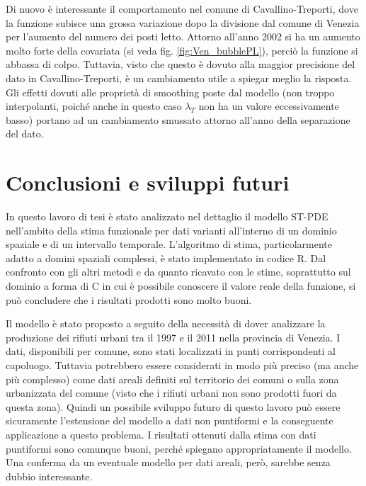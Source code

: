 \documentclass[a4paper,11pt,twoside,openright]{book}							%
\begin{document}
Di nuovo è interessante il comportamento nel comune di Cavallino-Treporti, dove la funzione subisce una grossa variazione dopo la divisione dal comune di Venezia per l'aumento del numero dei posti letto. Attorno all'anno 2002 si ha un aumento molto forte della covariata (si veda fig. \ref{fig:Ven_bubblePL}), perciò la funzione si abbassa di colpo. Tuttavia, visto che questo è dovuto alla maggior precisione del dato in Cavallino-Treporti, è un cambiamento utile a spiegar meglio la risposta. Gli effetti dovuti alle proprietà di smoothing poste dal modello (non troppo interpolanti, poiché anche in questo caso $\lambda_T$ non ha un valore eccessivamente basso) portano ad un cambiamento smussato attorno all'anno della separazione del dato.

\chapter{Conclusioni e sviluppi futuri}
\label{cap:conclusione}

In questo lavoro di tesi è stato analizzato nel dettaglio il modello ST-PDE nell'ambito della stima funzionale per dati varianti all'interno di un dominio spaziale e di un intervallo temporale. L'algoritmo di stima, particolarmente adatto a domini spaziali complessi, è stato implementato in codice R. Dal confronto con gli altri metodi e da quanto ricavato con le stime, soprattutto sul dominio a forma di C in cui è possibile conoscere il valore reale della funzione, si può concludere che i risultati prodotti sono molto buoni.

Il modello è stato proposto a seguito della necessità di dover analizzare la produzione dei rifiuti urbani tra il 1997 e il 2011 nella provincia di Venezia. I dati, disponibili per comune, sono stati localizzati in punti corrispondenti al capoluogo. Tuttavia potrebbero essere considerati in modo più preciso (ma anche più complesso) come dati areali definiti sul territorio dei comuni o sulla zona urbanizzata del comune (visto che i rifiuti urbani non sono prodotti fuori da questa zona). Quindi un possibile sviluppo futuro di questo lavoro può essere sicuramente l'estensione del modello a dati non puntiformi e la conseguente applicazione a questo problema. I risultati ottenuti dalla stima con dati puntiformi sono comunque buoni, perché spiegano appropriatamente il modello. Una conferma da un eventuale modello per dati areali, però, sarebbe senza dubbio interessante.
\end{document}
